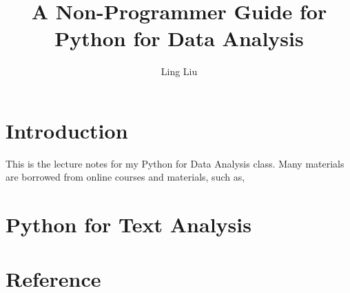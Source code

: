 \documentclass[11pt,fleqn]{book} %
\begin{document}
\title{A Non-Programmer Guide for Python for Data Analysis}
\author{Ling Liu}
\frontmatter
\maketitle
\tableofcontents
\mainmatter

\chapter{Introduction}\label{ch:intro}
This is the lecture notes for my Python for Data Analysis class.
Many materials are borrowed from online courses and materials, such as,
\citep{wujun2012}


\chapter{Python for Text Analysis}\label{ch:textany}

\chapter*{Reference}

\end{document}
